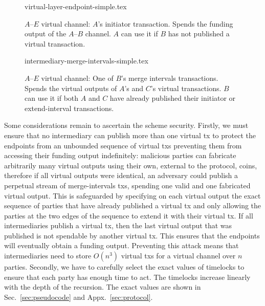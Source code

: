 %
  \begin{figure}[!htbp]
%
    {virtual-layer-endpoint-simple.tex}
    \caption{$A$--$E$ virtual channel: $A$'s initiator transaction. Spends the
    funding output of the $A$--$B$ channel. $A$ can use it if $B$ has not published
    a virtual transaction.}
    \label{figure:virtual-layer-endpoint-simple}
  \end{figure}
%
%
  \begin{figure}
%
    {intermediary-merge-intervals-simple.tex}
    \caption{$A$--$E$ virtual channel: One of $B$'s merge intervals
    transactions. Spends the virtual outputs of $A$'s and $C$'s virtual
    transactions. $B$ can use it if both $A$ and $C$ have already published
    their initiator or extend-interval transactions.}
    \label{figure:virtual-layer-merge-intervals-simple}
  \end{figure}
%

  Some considerations remain to ascertain the scheme security.
  Firstly, we must ensure that no intermediary can publish more than
  one virtual tx to protect the endpoints from an unbounded sequence of virtual
  txs preventing them from accessing their funding output indefinitely:
  malicious parties can fabricate arbitrarily many virtual outputs using
  their own, external to the protocol, coins, therefore if all virtual outputs
  were identical, an adversary could publish a perpetual stream of
  merge-intervals txs, spending one valid and one fabricated virtual output.
  This is safeguarded by
  specifying on each virtual output the exact sequence of parties that have
  already published a virtual tx and only allowing the parties at the two edges
  of the sequence
  to extend it with their virtual tx. If all intermediaries publish a virtual
  tx, then the last virtual output that was published is not spendable by
  another virtual
  tx. This ensures that the endpoints will eventually obtain a funding
  output. Preventing this attack means that intermediaries need to store
  $O(n^3)$ virtual txs for a virtual channel over $n$ parties. Secondly,
  we have to carefully select the exact values of timelocks to ensure that
  each party has enough time to act. The timelocks increase linearly
  with the depth of the recursion. The exact values are shown in
  Sec.~\ref{sec:pseudocode} and Appx.~\ref{sec:protocol}.

